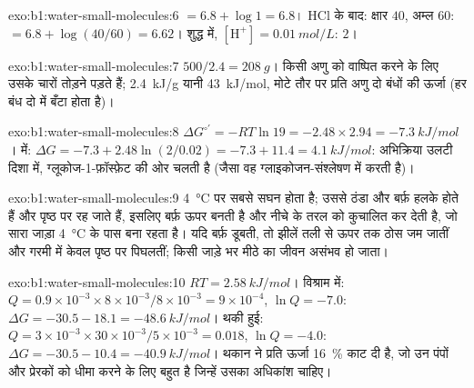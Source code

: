 \begin{solution}{exo:b1:water-small-molecules:6}
 $= 6.8 + \log 1 = 6.8$। HCl के बाद: क्षार $40$, अम्ल $60$:  $= 6.8 +
\log(40/60) = 6.62$। शुद्ध  में, $[\mathrm{H^+}] = \qty{0.01}{mol/L}$:
 $2$।
\end{solution}

\begin{solution}{exo:b1:water-small-molecules:7}
$500/2.4 = \qty{208}{g}$। किसी अणु को वाष्पित करने के लिए उसके चारों
 तोड़ने पड़ते हैं; \qty{2.4}{kJ/g} यानी \qty{43}{kJ/mol},
मोटे तौर पर प्रति अणु दो बंधों की ऊर्जा (हर बंध दो में बँटा होता है)।
\end{solution}

\begin{solution}{exo:b1:water-small-molecules:8}
$\Delta G^{\circ\prime} = -RT\ln 19 = -2.48\times 2.94 =
\qty{-7.3}{kJ/mol}$।  में: $\Delta G = -7.3 + 2.48\ln(2/0.02) =
-7.3 + 11.4 = \qty{+4.1}{kJ/mol}$: अभिक्रिया उलटी दिशा में,
ग्लूकोज-1-फ़ॉस्फ़ेट की ओर चलती है (जैसा वह ग्लाइकोजन-संश्लेषण में करती है)।
\end{solution}

\begin{solution}{exo:b1:water-small-molecules:9}
 \qty{4}{\celsius} पर सबसे सघन होता है; उससे ठंडा  और बर्फ़ हलके होते
हैं और पृष्ठ पर रह जाते हैं, इसलिए बर्फ़ ऊपर बनती है और नीचे के तरल को
कुचालित कर देती है, जो सारा जाड़ा \qty{4}{\celsius} के पास बना रहता है।
यदि बर्फ़ डूबती, तो झीलें तली से ऊपर तक ठोस जम जातीं और गरमी में केवल
पृष्ठ पर पिघलतीं; किसी जाड़े भर मीठे  का जीवन असंभव
हो जाता।
\end{solution}

\begin{solution}{exo:b1:water-small-molecules:10}
$RT = \qty{2.58}{kJ/mol}$। विश्राम में: $Q = 0.9\times 10^{-3}\times 8\times
10^{-3}/8\times 10^{-3} = 9\times 10^{-4}$, $\ln Q = -7.0$: $\Delta G =
-30.5 - 18.1 = \qty{-48.6}{kJ/mol}$। थकी हुई: $Q = 3\times 10^{-3}\times
30\times 10^{-3}/5\times 10^{-3} = 0.018$, $\ln Q = -4.0$: $\Delta G =
-30.5 - 10.4 = \qty{-40.9}{kJ/mol}$। थकान ने प्रति  ऊर्जा
\qty{16}{\%} काट दी है, जो उन पंपों और प्रेरकों को धीमा करने के लिए बहुत
है जिन्हें उसका अधिकांश चाहिए।
\end{solution}

